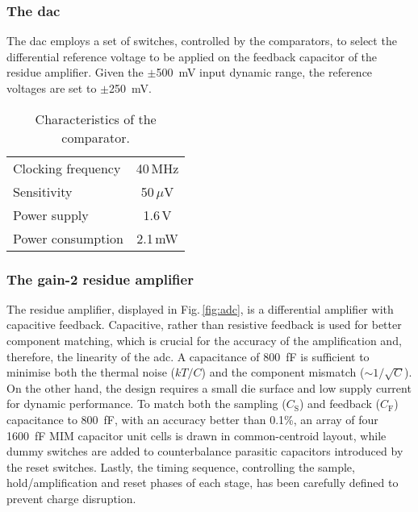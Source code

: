 \subsubsection*{The \gls{dac}}

The \gls{dac} employs a set of switches, controlled by the comparators, to select the differential reference voltage to 
be applied on the feedback capacitor of the residue amplifier. Given the $\pm$\SI{500}{mV} input dynamic range, the 
reference voltages are set to $\pm$\SI{250}{mV}.

\begin{table}[h]
\centering
	\vspace{0.5cm}
	\begin{tabular}{l c}
	\toprule
	Clocking frequency & 40\,MHz\\
	Sensitivity        & 50\,$\mu$V\\
	Power supply       & 1.6\,V\\
	Power consumption  & 2.1\,mW\\
	\bottomrule
	\end{tabular}
	\caption{\label{tab:comp}Characteristics of the comparator.}
\end{table}	

\subsubsection*{The gain-2 residue amplifier}

The residue amplifier, displayed in Fig.\,\ref{fig:adc}, is a differential amplifier with capacitive feedback. Capacitive, 
rather than resistive feedback is used for better component matching, which is crucial for the accuracy of the amplification 
and, therefore, the linearity of the \gls{adc}. A capacitance of \SI{800}{fF} is sufficient to minimise both the thermal 
noise ($kT/C$) and the component mismatch ($\sim$$1/\sqrt{C}$). On the other hand, the design requires a small die surface 
and low supply current for dynamic performance. To match both the sampling ($C_\mathrm{S}$) and feedback ($C_\mathrm{F}$) 
capacitance to \SI{800}{fF}, with an accuracy better than 0.1\%, an array of four \SI{1600}{fF} MIM capacitor unit cells is 
drawn in common-centroid layout, while dummy switches are added to counterbalance parasitic capacitors introduced by the 
reset switches. Lastly, the timing sequence, controlling the sample, hold/amplification and reset phases of each stage, has 
been carefully defined to prevent charge disruption.

